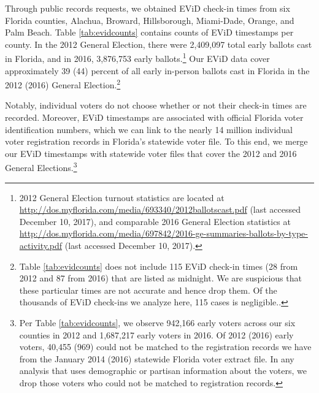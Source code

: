 \documentclass[12pt,titlepage]{article}
\begin{document}
Through public records requests, we obtained EViD check-in times from
six Florida counties, Alachua, Broward, Hillsborough, Miami-Dade,
Orange, and Palm Beach. Table \ref{tab:evidcounts} contains counts of
EViD timestamps per county. In the 2012 General Election, there were
2,409,097 total early ballots cast in Florida, and in 2016, 3,876,753
early ballots.\footnote{2012 General Election turnout
  statistics are located at
  \url{http://dos.myflorida.com/media/693340/2012ballotscast.pdf}
  (last accessed December 10, 2017), and comparable 2016 General
  Election statistics at
  \url{http://dos.myflorida.com/media/697842/2016-ge-summaries-ballots-by-type-activity.pdf}
  (last accessed December 10, 2017).} Our EViD data cover
approximately 39 (44) percent of all early in-person ballots cast in
Florida in the 2012 (2016) General Election.\footnote{Table
  \ref{tab:evidcounts} does
  not include 115 EViD check-in times (28 from 2012 and 87 from 2016)
  that are listed as midnight.  We are suspicious that these
  particular times are not accurate and hence drop them. Of the
  thousands of EViD   check-ins we analyze here, 115 cases is
  negligible.\label{fn:midnight}.}





Notably, individual voters do not choose whether or not their check-in
times are recorded. Moreover, EViD timestamps are associated with
official Florida voter identification numbers, which we can link to
the nearly 14 million individual voter registration records in
Florida's statewide voter file. To this end, we merge our EViD
timestamps with statewide voter files that cover the 2012 and 2016
General Elections.\footnote{Per Table
  \ref{tab:evidcounts}, we observe 942,166 early voters across our
  six counties in 2012 and 1,687,217 early voters in 2016. Of
  2012 (2016) early voters, 40,455 (969) could not be matched to the registration
  records we have from the January 2014 (2016) statewide Florida voter
  extract file.  In any analysis that uses demographic
  or partisan information about the voters, we drop those voters who
  could not be matched to registration records.}

\end{document}
